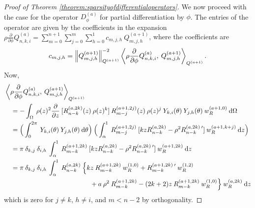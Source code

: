 \documentclass[11pt, oneside]{article}   	%
\newcommand{\genjac}{R}
\newcommand{\genjacnmk}{\genjac_{n-k}}
\newcommand{\genjacmmj}{\genjac_{m-j}}
\newcommand{\genjacw}{w_\genjac}
\newcommand{\scop}{Q}
\newcommand{\scopnki}{\scop_{n,k,i}}
\newcommand{\scopmjh}{\scop_{m,j,h}}
\newcommand{\scopnkia}{\scopnki^{(a)}}
\newcommand{\ch}{Y}
\newcommand{\chki}{\ch_{k,i}}
\newcommand{\chjh}{\ch_{j,h}}
\newcommand{\ppphi}{\frac{\partial}{\partial \phi}}
\newcommand{\ppz}{\frac{\partial}{\partial z}}
\newcommand{\rhoppphi}{\rho \ppphi}
\begin{document}
\begin{proof}[Proof of Theorem \ref{theorem:sparsityofdifferentialoperators}]
We now proceed with the case for the operator $D_\phi^{(a)}$ for partial differentiation by $\phi$. The entries of the operator are given by the coefficients in the expansion $\rhoppphi \scopnkia = \sum_{m=0}^{n+1} \sum_{j=0}^m \sum_{h=0}^1 c_{m,j,h} \: \scopmjh^{(a+1)}$, where the coefficients are
\begin{align*}
	c_{m,j,h} = \norm{\scopmjh^{(a+1)}}^{-2}_{\scop^{(a+1)}} \ip<\rhoppphi \scopnkia, \: \scopmjh^{(a+1)}>_{\scop^{(a+1)}}.
\end{align*}
Now,
\begin{align*}
	&\ip<\rhoppphi \scopnkia, \: \scopmjh^{(a+1)}>_{\scop^{(a+1)}} \\
	&\quad = - \int_\Omega \: \rho(z)^2 \ppz \:  [\genjacnmk^{(a,2k)}(z) \: \rho(z)^k] \: \genjacmmj^{(a+1,2j)}(z) \: \rho(z)^j \: \chki(\theta) \: \chjh(\theta) \: \genjacw^{(a+1, 0)} \: \D \Omega \\
	&\quad = \Big( \int_0^{2\pi} \: \chki(\theta) \: \chjh(\theta) \: \D \theta \Big) \: \Big( \int_\alpha^1 \: \genjacmmj^{(a+1,2j)} \: [k z \genjacnmk^{(a, 2k)} - \rho^2 \genjacnmk^{(a, 2k) \: \prime}] \: \genjacw^{(a+1, k + j)} \: \D z \Big) \\
	&\quad = \pi \: \delta_{k,j} \: \delta_{i,h} \: \int_\alpha^1 \: \genjac_{m-k}^{(a+1,2k)} \: [k z \genjacnmk^{(a, 2k)} - \rho^2 \genjacnmk^{(a, 2k) \: \prime}] \: \genjacw^{(a+1, 2k)} \: \D z \\
	&\quad = \pi \: \delta_{k,j} \: \delta_{i,h} \: \int_\alpha^1 \: \genjacnmk^{(a, 2k)} \: \Big\{  k z \: \genjac_{m-k}^{(a+1,2k)} \: \genjacw^{(1, 0)} + \genjac_{m-k}^{(a+1,2k) \: \prime} \: \genjacw^{(1, 2)}\\
	&\quad \quad \quad \quad \quad \quad \quad \quad \quad \quad \quad \quad \quad + a \: \rho^2 \: \genjac_{m-k}^{(a+1,2k)} - (2k+2) z \: \genjac_{m-k}^{(a+1,2k)} \: \genjacw^{(1, 0)} \Big\} \: \genjacw^{(a, 2k)} \: \D z
\end{align*}
which is zero for $j \ne k$, $h \ne i$, and $m < n - 2$ by orthogonality.


\end{proof}
\end{document}

